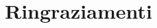 \documentclass[12pt,a4paper,openright,twoside]{report}
\begin{document}
\clearpage{\pagestyle{empty}\cleardoublepage}		%












\chapter*{Ringraziamenti}

\thispagestyle{empty}

\end{document}
